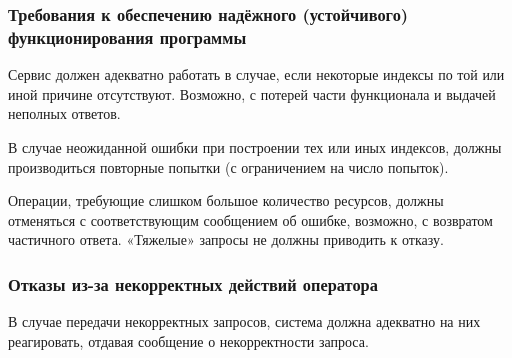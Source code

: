     \subsubsection{Требования к обеспечению надёжного (устойчивого) функционирования программы}
    	Сервис должен адекватно работать в случае, если некоторые индексы по той или иной причине отсутствуют. Возможно, с потерей части функционала и выдачей неполных ответов.
    	
    	В случае неожиданной ошибки при построении тех или иных индексов, должны производиться повторные попытки (с ограничением на число попыток).
    	
    	Операции, требующие слишком большое количество ресурсов, должны отменяться с соответствующим сообщением об ошибке, возможно, с возвратом частичного ответа. «Тяжелые» запросы не должны приводить к отказу.

    \subsubsection{Отказы из-за некорректных действий оператора}
    	В случае передачи некорректных запросов, система должна адекватно на них реагировать, отдавая сообщение о некорректности запроса.

\clearpage